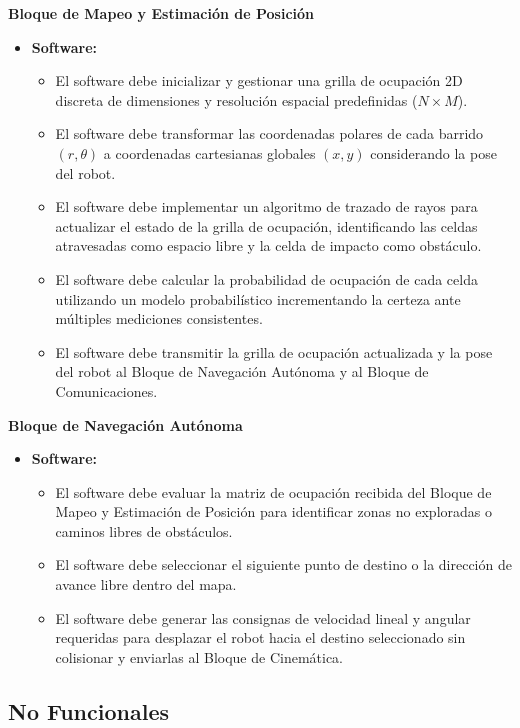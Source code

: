 \noindent\textbf{Bloque de Mapeo y Estimación de Posición}
\begin{itemize}
    \item \textbf{Software:}
    \begin{itemize}
        \item El software debe inicializar y gestionar una grilla de ocupación 2D discreta de dimensiones y resolución espacial predefinidas ($N \times M$).
        \item El software debe transformar las coordenadas polares de cada barrido $(r, \theta)$ a coordenadas cartesianas globales $(x, y)$ considerando la pose del robot.
        \item El software debe implementar un algoritmo de trazado de rayos para actualizar el estado de la grilla de ocupación, identificando las celdas atravesadas como espacio libre y la celda de impacto como obstáculo.
        \item El software debe calcular la probabilidad de ocupación de cada celda utilizando un modelo probabilístico incrementando la certeza ante múltiples mediciones consistentes.
        \item El software debe transmitir la grilla de ocupación actualizada y la pose del robot al Bloque de Navegación Autónoma y al Bloque de Comunicaciones.
    \end{itemize}
\end{itemize}

\noindent\textbf{Bloque de Navegación Autónoma}
\begin{itemize}
    \item \textbf{Software:}
    \begin{itemize}
        \item El software debe evaluar la matriz de ocupación recibida del Bloque de Mapeo y Estimación de Posición para identificar zonas no exploradas o caminos libres de obstáculos.
        \item El software debe seleccionar el siguiente punto de destino o la dirección de avance libre dentro del mapa.
        \item El software debe generar las consignas de velocidad lineal y angular requeridas para desplazar el robot hacia el destino seleccionado sin colisionar y enviarlas al Bloque de Cinemática.
    \end{itemize}
\end{itemize}

\subsection{No Funcionales}

